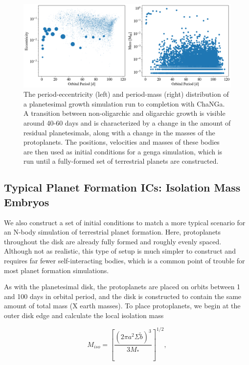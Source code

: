 \begin{figure}
\begin{center}
    \includegraphics[width=\textwidth]{figures/stip/changa_ics.png}
    \caption{The period-eccentricity (left) and period-mass (right) distribution of a planetesimal growth simulation run to completion with {\sc ChaNGa}. A transition between non-oligarchic and oligarchic growth is visible around 40-60 days and is characterized by a change in the amount of residual planetesimals, along with a change in the masses of the protoplanets. The positions, velocities and masses of these bodies are then used as initial conditions for a {\sc genga} simulation, which is run until a fully-formed set of terrestrial planets are constructed.\label{fig:changa_ics}}
\end{center}
\end{figure}

\subsection{Typical Planet Formation ICs: Isolation Mass Embryos}

We also construct a set of initial conditions to match a more typical scenario for an N-body simulation of terrestrial planet formation. Here, protoplanets throughout the disk are already fully formed and roughly evenly spaced. Although not as realistic, this type of setup is much simpler to construct and requires far fewer self-interacting bodies, which is a common point of trouble for most planet  formation simulations.

As with the planetesimal disk, the protoplanets are placed on orbits between 1 and 100 days in orbital period, and the disk is constructed to contain the same amount of total mass (X earth masses). To place protoplanets, we begin at the outer disk edge and calculate the local isolation mass \cite{kokubo02}

\begin{equation}\label{eq:iso}
	M_{iso} = \left[ \frac{\left( 2 \pi a^2 \Sigma \tilde{b} \right)^3}{3 M_{*}} \right]^{1/2},
\end{equation}

